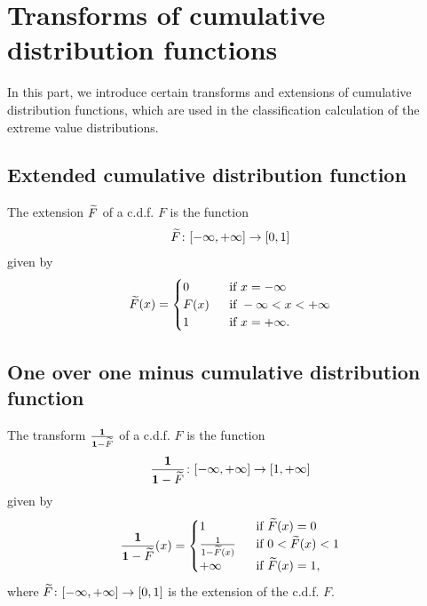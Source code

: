 \chapter{Transforms of cumulative distribution functions}

In this part, we introduce certain transforms and extensions of
cumulative distribution functions, which are used in the classification
calculation of the extreme value distributions.


\section{Extended cumulative distribution function}

\begin{definition}
  \label{def:cdf-extend}
  \leanok
  The extension $\widetilde{F}$ of a c.d.f. $F$ is the function
  \begin{align*}
    \widetilde{F} \colon [-\infty,+\infty] \to [0,1]
  \end{align*}
  given by
  \begin{align*}
    \widetilde{F}(x) = \begin{cases}
      0 & \; \text{ if } x = -\infty \\
      F(x) & \; \text{ if } -\infty < x < +\infty \\
      1 & \; \text{ if } x = +\infty .
      \end{cases}
  \end{align*}
\end{definition}


\section{One over one minus cumulative distribution function}

\begin{definition}
  \label{def:one-div-one-sub-cdf}
  \leanok
  The transform $\frac{\mathbf{1}}{\mathbf{1}-\widetilde{F}}$ of a c.d.f. $F$ is the function
  \begin{align*}
    \frac{\mathbf{1}}{\mathbf{1}-\widetilde{F}} \colon [-\infty,+\infty] \to [1,+\infty]
  \end{align*}
  given by
  \begin{align*}
    \frac{\mathbf{1}}{\mathbf{1}-\widetilde{F}}(x) = \begin{cases}
      1 & \; \text{ if } \widetilde{F}(x) = 0 \\
      \frac{1}{1-\widetilde{F}(x)} & \; \text{ if } 0 < \widetilde{F}(x) < 1 \\
      +\infty & \; \text{ if } \widetilde{F}(x) = 1 ,
      \end{cases}
  \end{align*}
  where $\widetilde{F} \colon [-\infty,+\infty] \to [0,1]$ is the extension of the c.d.f. $F$.
\end{definition}


